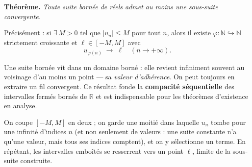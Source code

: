 ﻿%



\begin{tcolorbox}[thmbox]
  \textbf{Théorème.}\enspace{}
  \textit{Toute suite bornée de réels admet au moins une
  sous-suite convergente.}

  \medskip
  Précisément : si $\exists\, M>0$ tel que $|u_n| \leq M$ pour tout $n$,
  alors il existe $\varphi : \mathbb{N} \hookrightarrow \mathbb{N}$
  strictement croissante et $\ell \in [-M,M]$ avec
  \[
    u_{\varphi(n)} \;\longrightarrow\; \ell \quad (n \to +\infty).
  \]
\end{tcolorbox}

\begin{significationintuitive}
Une suite bornée vit dans un domaine borné : elle revient infiniment souvent au
voisinage d'au moins un point — sa \emph{valeur d'adhérence}.
On peut toujours en extraire un fil convergent. Ce résultat fonde la
\textbf{compacité séquentielle} des intervalles
fermés bornés de $\mathbb{R}$ et est indispensable pour les théorèmes
d'existence en analyse.
\end{significationintuitive}

\decsep{}


\begin{ideepreuve}
On coupe $[-M,M]$ en deux ; on garde une moitié dans laquelle $u_n$ tombe
pour une infinité d'indices $n$ (et non seulement de valeurs : une suite
constante n'a qu'une valeur, mais tous ses indices comptent), et on y
sélectionne un terme. En répétant, les intervalles emboîtés
se resserrent vers un point $\ell$, limite de la sous-suite construite.
\end{ideepreuve}

